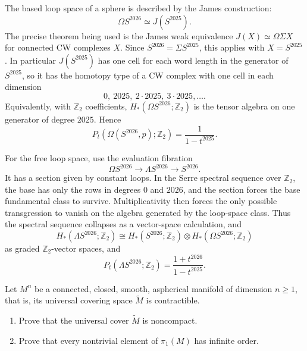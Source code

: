 \begin{solution}
The based loop space of a sphere is described by the James construction:
\[
    \Omega S^{2026}\simeq J(S^{2025}).
\]
The precise theorem being used is the James weak equivalence
$J(X)\simeq \Omega\Sigma X$ for connected CW complexes $X$. Since
$S^{2026}=\Sigma S^{2025}$, this applies with $X=S^{2025}$. In particular
$J(S^{2025})$ has one cell for each word length in the generator of
$S^{2025}$, so it has the homotopy type of a CW complex with one cell in each
dimension
\[
    0,\ 2025,\ 2\cdot 2025,\ 3\cdot 2025,\ldots.
\]
Equivalently, with $\mathbb{Z}_2$ coefficients,
$H_*(\Omega S^{2026};\mathbb{Z}_2)$ is the tensor algebra on one generator of
degree $2025$. Hence
\[
    P_t(\Omega(S^{2026},p);\mathbb{Z}_2)
    =
    \frac{1}{1-t^{2025}}.
\]

For the free loop space, use the evaluation fibration
\[
    \Omega S^{2026}\longrightarrow \Lambda S^{2026}\longrightarrow S^{2026}.
\]
It has a section given by constant loops. In the Serre spectral sequence over
$\mathbb{Z}_2$, the base has only the rows in degrees $0$ and $2026$, and the
section forces the base fundamental class to survive. Multiplicativity then
forces the only possible transgression to vanish on the algebra generated by the
loop-space class. Thus the spectral sequence collapses as a vector-space
calculation, and
\[
    H_*(\Lambda S^{2026};\mathbb{Z}_2)
    \cong
    H_*(S^{2026};\mathbb{Z}_2)\otimes
    H_*(\Omega S^{2026};\mathbb{Z}_2)
\]
as graded $\mathbb{Z}_2$-vector spaces, and
\[
    P_t(\Lambda S^{2026};\mathbb{Z}_2)
    =
    \frac{1+t^{2026}}{1-t^{2025}}.
\]
\end{solution}

\begin{exercise}
\label{geometry:2026:5}
Let $M^n$ be a connected, closed, smooth, aspherical manifold of dimension
$n\geq 1$, that is, its universal covering space $\widetilde{M}$ is contractible.
\begin{enumerate}
    \item Prove that the universal cover $\widetilde{M}$ is noncompact.
    \item Prove that every nontrivial element of $\pi_1(M)$ has infinite order.
\end{enumerate}
\end{exercise}

